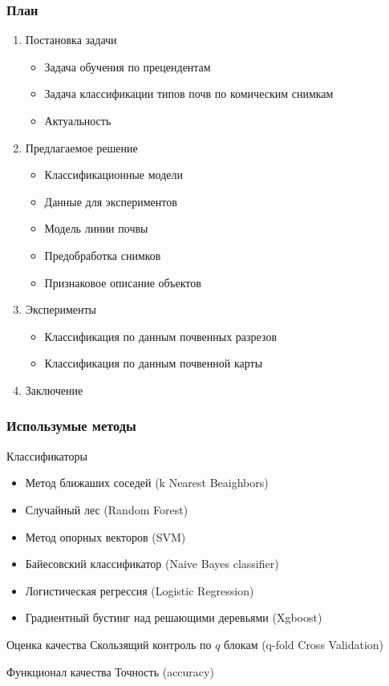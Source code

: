 \documentclass{beamer}
\begin{document}
\begin{frame}
\frametitle{План}
\begin{enumerate}
    \item Постановка задачи
        \begin{itemize}
            \item Задача обучения по прецендентам
            \item Задача классификации типов почв по комическим снимкам
            \item Актуальность
        \end{itemize}
    \item {\color{blue} Предлагаемое решение}
    \begin{itemize}
        \item Классификационные модели
        \item Данные для экспериментов
        \item Модель линии почвы
        \item Предобработка снимков
        \item Признаковое описание объектов
    \end{itemize}
    \item Эксперименты
    \begin{itemize}
        \item Классификация по данным почвенных разрезов
        \item Классификация по данным почвенной карты
    \end{itemize}
    \item Заключение
\end{enumerate}
\end{frame}

\begin{frame}
\frametitle{Использумые методы}
\begin{block}{Классификаторы}
\begin{itemize}
    \item Метод ближаших соседей (k Nearest Beaighbors)
    \item Случайный лес (Random Forest)
    \item Метод опорных векторов (SVM)
    \item Байесовский классификатор (Naive Bayes classifier)
    \item Логистическая регрессия (Logistic Regression)
    \item Градиентный бустинг над решающими деревьями (Xgboost)
\end{itemize}
\end{block}
\begin{block}{Оценка качества}
Скользящий контроль по $q$ блокам (q-fold Cross Validation)
\end{block}
\begin{block}{Функционал качества}
Точность (accuracy)
\end{block}
\end{frame}
\end{document}
